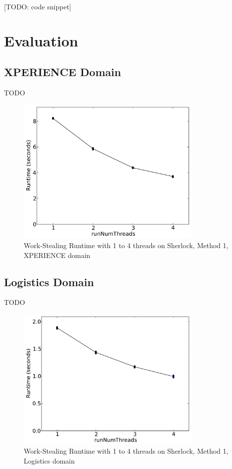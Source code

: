 \documentclass[12pt,twoside,abbrevs,msc,ai,notimes,logo,sansheadings]{infthesis}
\begin{document}
  [TODO: code snippet]
  
  \section{Evaluation}
  \subsection{XPERIENCE Domain}
  TODO
  
  \begin{figure}[!htbp]
  \begin{centering}
  \includegraphics[width=0.8\textwidth]{images/threads-xper5-sherlock-1-1}
  \par\end{centering}
  \caption{Work-Stealing Runtime with 1 to 4 threads on Sherlock, Method 1, XPERIENCE domain}
  \end{figure}
  
  \subsection{Logistics Domain}
  TODO
  
  \begin{figure}[!htbp]
  \begin{centering}
  \includegraphics[width=0.8\textwidth]{images/threads-log3-sherlock-1-1}
  \par\end{centering}
  \caption{Work-Stealing Runtime with 1 to 4 threads on Sherlock, Method 1, Logistics domain}
  \end{figure}
\end{document}
